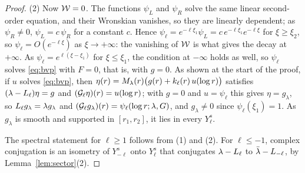 \begin{proof}
(2) Now $\mathcal{W}=0$. The functions $\psi_L$ and $\psi_R$ solve the same linear
second-order equation, and their Wronskian vanishes, so they are linearly
dependent; as $\psi_R\ne0$, $\psi_L=c\,\psi_R$ for a constant $c$. Hence
$\psi_\ell=e^{-\ell\xi_1}\psi_L=c\,e^{-\ell\xi_1}e^{-\ell\xi}$ for $\xi\ge\xi_2$, so
$\psi_\ell=O(e^{-\ell\xi})$ as $\xi\to+\infty$: the vanishing of $\mathcal{W}$ is what gives
the decay at $+\infty$. As $\psi_\ell=e^{\ell(\xi-\xi_1)}$ for $\xi\le\xi_1$, the
condition at $-\infty$ holds as well, so $\psi_\ell$ solves \eqref{eq:bvp} with
$F=0$, that is, with $g=0$. As shown at the start of the proof, if $u$ solves \eqref{eq:bvp}, then
$\eta(r)=M_\lambda(r)\big(g(r)+k_\ell(r)\,u(\log r)\big)$ satisfies
$(\lambda-L_{\ell})\eta=g$ and $(\mathcal{G}_\ell\eta)(r)=u(\log r)$; with $g=0$ and
$u=\psi_\ell$ this gives $\eta=g_\lambda$, so $L_{\ell}g_\lambda=\lambda g_\lambda$ and
$(\mathcal{G}_\ell g_\lambda)(r)=\psi_\ell(\log r;\lambda,G)$, and
$g_\lambda\ne0$ since $\psi_\ell(\xi_1)=1$. As
$g_\lambda$ is smooth and supported in $[r_1,r_2]$, it lies in every $Y^s_\ell$.

The spectral statement for $\ell\ge1$ follows from (1) and (2). For $\ell\le-1$,
complex conjugation is an isometry of $Y^s_{-\ell}$ onto
$Y^s_\ell$ that conjugates $\lambda-L_{\ell}$ to $\bar\lambda-L_{-\ell}$, by
Lemma~\ref{lem:sector}(2).
\end{proof}

